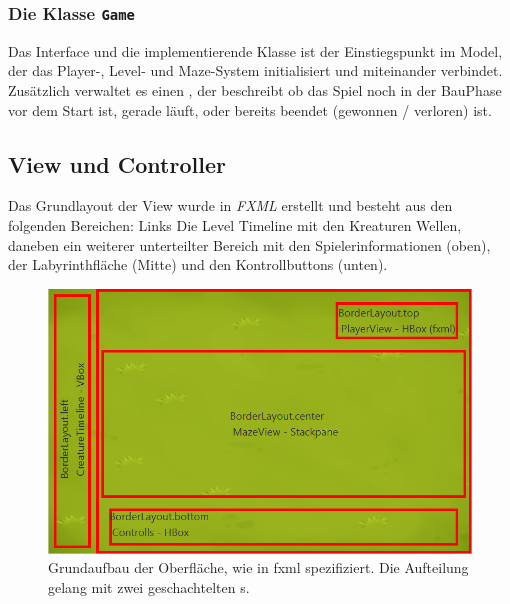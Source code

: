 \subsubsection{Die Klasse \texttt{Game}}
Das Interface  und die implementierende Klasse  ist der Einstiegspunkt im Model, der das Player-, Level- und Maze-System initialisiert und miteinander verbindet. Zusätzlich verwaltet es einen , der beschreibt ob das Spiel noch in der BauPhase vor dem Start ist, gerade läuft, oder bereits beendet (gewonnen / verloren) ist.

\subsection{View und Controller} %
\label{sub:view}

Das Grundlayout der View wurde in \emph{FXML} erstellt und besteht aus den folgenden Bereichen: Links Die Level Timeline mit den Kreaturen Wellen, daneben ein weiterer unterteilter Bereich mit den Spielerinformationen (oben), der Labyrinthfläche (Mitte) und den Kontrollbuttons (unten).

\begin{figure}[htb]
  \centering
  \includegraphics[width=\linewidth]{images/layout.png}
  \caption{Grundaufbau der Oberfläche, wie in fxml spezifiziert. Die Aufteilung gelang mit zwei geschachtelten s.}
\end{figure}

